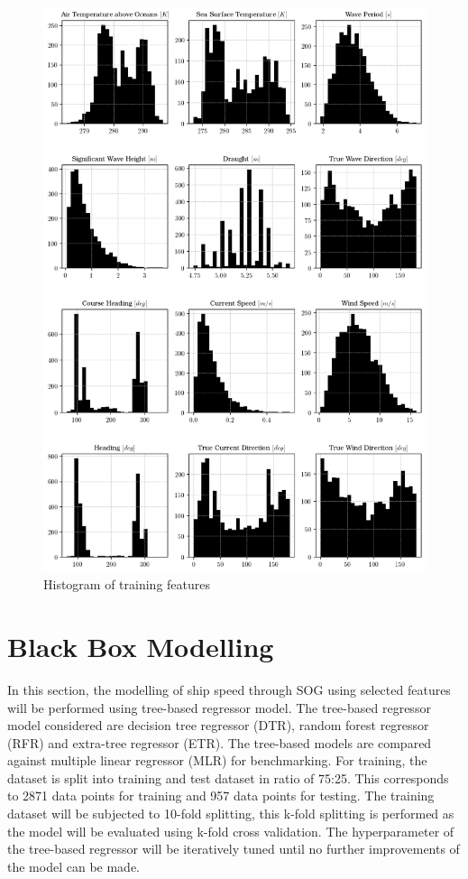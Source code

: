 \begin{figure}
    \centering
    \includegraphics[width=.9\linewidth]{02_figures/hist_init_preprocessing.png}
    \caption{Histogram of training features}
    \label{fig:hist_training_ftr_label}
\end{figure}

\section{Black Box Modelling}\label{sec:BBM_modelling}

In this section, the modelling of ship speed through SOG using selected features will be performed using tree-based regressor model. The tree-based regressor model considered are decision tree regressor (DTR), random forest regressor (RFR) and extra-tree regressor (ETR). The tree-based models are compared against multiple linear regressor (MLR) for benchmarking. For training, the dataset is split into training and test dataset in ratio of 75:25. This corresponds to 2871 data points for training and 957 data points for testing. The training dataset will be subjected to 10-fold splitting, this k-fold splitting is performed as the model will be evaluated using k-fold cross validation. The hyperparameter of the tree-based regressor will be iteratively tuned until no further improvements of the model can be made.\\



